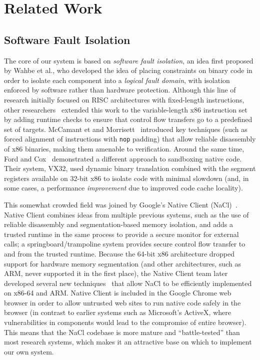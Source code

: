 \section{Related Work}
\label{sec:relwork}

\subsection{Software Fault Isolation}

The core of our system is based on \emph{software fault isolation}, an
idea first proposed by Wahbe et al., who developed the idea of placing
constraints on binary code in order to isolate each component into a
\emph{logical fault domain}, with isolation enforced by software rather
than hardware protection. Although this line of research initially
focused on RISC architectures with fixed-length instructions, other
researchers~\cite{Small:1997,Erlingsson:2000} extended this work to the
variable-length x86 instruction set by adding runtime checks to ensure
that control flow transfers go to a predefined set of targets. McCamant
et and Morrisett~\cite{McCamant:2006} introduced key techniques (such as
forced alignment of instructions with \texttt{nop} padding) that allow
reliable disassembly of x86 binaries, making them amenable to
verification. Around the same time, Ford and Cox~\cite{Ford:2008}
demonstrated a different approach to sandboxing native code. Their
system, VX32, used dynamic binary translation combined with the segment
registers available on 32-bit x86 to isolate code with minimal slowdown
(and, in some cases, a performance \emph{improvement} due to improved
code cache locality).

This somewhat crowded field was joined by Google's Native Client
(NaCl)~\cite{Yee:2009}. Native Client combines ideas from multiple
previous systems, such as the use of reliable disassembly and
segmentation-based memory isolation, and adds a trusted runtime in the
same process to provide a secure monitor for external calls; a
springboard/trampoline system provides secure control flow transfer to
and from the trusted runtime. Because the 64-bit x86 architecture
dropped support for hardware memory segmentation (and other
architectures, such as ARM, never supported it in the first place), the
Native Client team later developed several new
techniques~\cite{Sehr:2010} that allow NaCl to be efficiently
implemented on x86-64 and ARM. Native Client is included in the Google
Chrome web browser in order to allow untrusted web sites to run native
code safely in the browser (in contrast to earlier systems such as
Microsoft's ActiveX, where vulnerabilities in components would lead to
the compromise of entire browser). This means that the NaCl codebase is
more mature and ``battle-tested'' than most research systems, which
makes it an attractive base on which to implement our own system.

